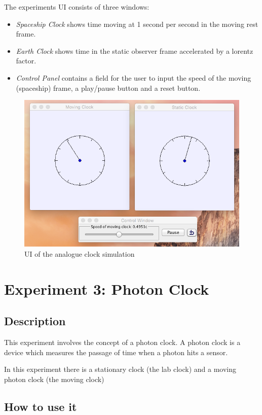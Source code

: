 \documentclass[11pt]{article}
\begin{document}
The experiments UI consists of three windows:
\begin{itemize}
\item \emph{Spaceship Clock} shows time moving at 1 second per second in the moving rest frame.
\item \emph{Earth Clock} shows time in the static observer frame accelerated by a lorentz factor.
\item \emph{Control Panel} contains a field for the user to input the speed of the moving (spaceship) frame, a play/pause button and a reset button.
\end{itemize}
\begin{figure}[htb]
\centering
\includegraphics[width=.9\linewidth]{./analogueUI.png}
\caption{UI of the analogue clock simulation}
\end{figure}
\section*{Experiment 3: Photon Clock}
\label{sec-3}
\subsection*{Description}
\label{sec-3-1}

This experiment involves the concept of a photon clock. A photon clock is a device which measures the passage of time when a photon hits a sensor.

In this experiment there is a stationary clock (the lab clock) and a moving photon clock (the moving clock) 
   
\subsection*{How to use it}
\label{sec-3-2}
\end{document}
